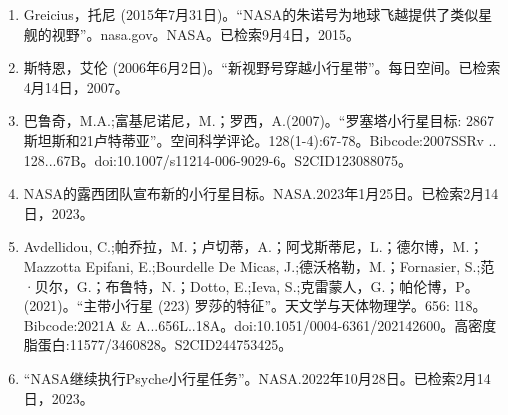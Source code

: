 \begin{enumerate}
\item Greicius，托尼 (2015年7月31日)。“NASA的朱诺号为地球飞越提供了类似星舰的视野”。nasa.gov。NASA。已检索9月4日，2015。
\item 斯特恩，艾伦 (2006年6月2日)。“新视野号穿越小行星带”。每日空间。已检索4月14日，2007。
\item 巴鲁奇，M.A.;富基尼诺尼，M.；罗西，A.(2007)。“罗塞塔小行星目标: 2867斯坦斯和21卢特蒂亚”。空间科学评论。128(1-4):67-78。Bibcode:2007SSRv .. 128...67B。doi:10.1007/s11214-006-9029-6。S2CID123088075。 
\item NASA的露西团队宣布新的小行星目标。NASA.2023年1月25日。已检索2月14日，2023。
\item Avdellidou, C.;帕乔拉，M.；卢切蒂，A.；阿戈斯蒂尼，L.；德尔博，M.；Mazzotta Epifani, E.;Bourdelle De Micas, J.;德沃格勒，M.；Fornasier, S.;范·贝尔，G.；布鲁特，N.；Dotto, E.;Ieva, S.;克雷蒙人，G.；帕伦博，P。(2021)。“主带小行星 (223) 罗莎的特征”。天文学与天体物理学。656: l18。Bibcode:2021A & A...656L..18A。doi:10.1051/0004-6361/202142600。高密度脂蛋白:11577/3460828。S2CID244753425。 
\item “NASA继续执行Psyche小行星任务”。NASA.2022年10月28日。已检索2月14日，2023。
\end{enumerate}
